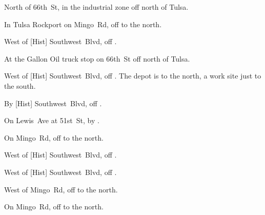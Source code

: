 
\begin{LocationList}

North of 66th~St, in the industrial zone off  north of Tulsa.

In Tulsa Rockport on Mingo~Rd, off  to the north.

\Location{\GarageHQ \Garage}
West of [Hist] Southwest~Blvd, off  .

At the Gallon Oil truck stop on 66th~St off  north of Tulsa.

West of [Hist] Southwest~Blvd, off  .
The depot is to the north, a work site just to the south.

By [Hist] Southwest~Blvd, off  .

On Lewis~Ave at 51st~St, by  .

On Mingo~Rd, off  to the north.

West of [Hist] Southwest~Blvd, off  .

\Location{\TruckService \Service}
West of [Hist] Southwest~Blvd, off  .

West of Mingo~Rd, off  to the north.

On Mingo~Rd, off  to the north.

\end{LocationList}

